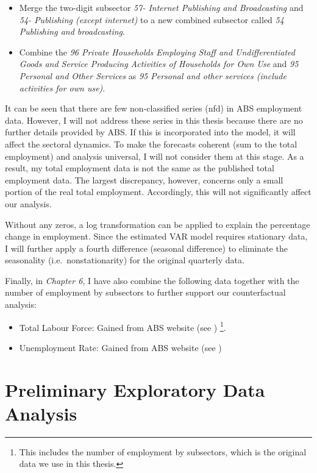 \documentclass{monashthesis}
\begin{document}
\begin{itemize}
\item
  Merge the two-digit subsector \emph{57- Internet Publishing and Broadcasting} and \emph{54- Publishing (except internet)} to a new combined subsector called \emph{54 Publishing and broadcasting}.
\item
  Combine the \emph{96 Private Households Employing Staff and Undifferentiated Goods and Service Producing Activities of Households for Own Use} and \emph{95 Personal and Other Services} as \emph{95 Personal and other services (include activities for own use)}.
\end{itemize}

It can be seen that there are few non-classified series (nfd) in ABS employment data. However, I will not address these series in this thesis because there are no further details provided by ABS. If this is incorporated into the model, it will affect the sectoral dynamics. To make the forecasts coherent (sum to the total employment) and analysis universal, I will not consider them at this stage. As a result, my total employment data is not the same as the published total employment data. The largest discrepancy, however, concerns only a small portion of the real total employment. Accordingly, this will not significantly affect our analysis.

Without any zeros, a log transformation can be applied to explain the percentage change in employment. Since the estimated VAR model requires stationary data, I will further apply a fourth difference (seasonal difference) to eliminate the seasonality (i.e.~nonstationarity) for the original quarterly data.

Finally, in \emph{Chapter 6}, I have also combine the following data together with the number of employment by subsectors \autocite{ABS2022} to further support our counterfactual analysis:

\begin{itemize}
\item
  Total Labour Force: Gained from ABS website (see \textcite{ABS2022}) \footnote{This includes the number of employment by subsectors, which is the original data we use in this thesis.}.
\item
  Unemployment Rate: Gained from ABS website (see \textcite{ABS2022a})
\end{itemize}

\hypertarget{preliminary-exploratory-data-analysis}{%
\section{Preliminary Exploratory Data Analysis}\label{preliminary-exploratory-data-analysis}}
\end{document}
